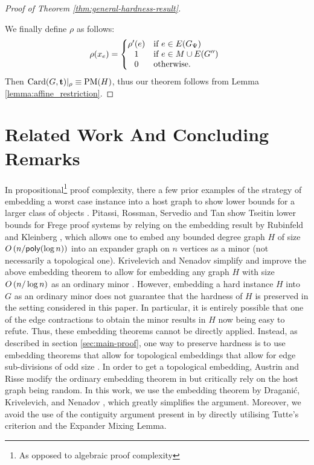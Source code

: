 \documentclass[11pt]{article}
\begin{document}
\begin{proof}[Proof of Theorem \ref{thm:general-hardness-result}]
\begin{enumerate}
\end{enumerate}

We finally define $\rho$ as follows:
\[
\rho(x_e) =
\left\{
\begin{array}{@{}cl}
\rho'(e) & \text{if } e \in \Edges{G_{\EmbeddingFunc}} \\
1 & \text{if } e \in M \cup E(G'') \\
0 & \text{otherwise.}
\end{array}
\right.
\]
Then $\text{Card}(G, \mathbf{t})|_\rho \equiv \text{PM}(H)$, thus our theorem follows from Lemma \ref{lemma:affine_restriction}.
\end{proof}


\section{Related Work And Concluding Remarks}
\label{sec:related-work}

In propositional\footnote{As opposed to algebraic proof complexity} proof complexity, there a few prior examples of the strategy of embedding a worst case instance into a host graph to show lower bounds for a larger class of objects \cite{itsykson2021Near, pitassi2016PolyLogFrege}.
Pitassi, Rossman, Servedio and Tan show Tseitin lower bounds for Frege proof systems \citep{pitassi2016PolyLogFrege} by relying on the embedding result by Rubinfeld and Kleinberg \citep{kleinberg1996short}, which allows one to embed any bounded degree graph $H$ of size $O\left(n/\mathsf{poly}(\log n)\right)$ into an expander graph on $n$ vertices as a minor (not necessarily a topological one). 
Krivelevich and Nenadov simplify and improve the above embedding theorem to allow for embedding any graph $H$ with size $O\left(n/\log n\right)$ as an ordinary minor \citep{krivelevich2021completeMinors}.
However, embedding a hard instance $H$ into $G$ as an ordinary minor does not guarantee that the hardness of $H$ is preserved in the setting considered in this paper. In particular, it is entirely possible that one of the edge contractions to obtain the minor results in $H$ now being easy to refute.
Thus, these embedding theorems cannot be directly applied.
Instead, as described in section \ref{sec:main-proof}, one way to preserve hardness is to use  embedding theorems that allow for topological embeddings that allow for edge sub-divisions of odd size \citep{draganic22rolling, nenadov2023routing}.
In order to get a topological embedding, Austrin and Risse modify the ordinary embedding theorem in \citep{krivelevich2021completeMinors} but critically rely on the host graph being random.
In this work, we use the embedding theorem by Dragani\'c, Krivelevich, and Nenadov \cite{draganic22rolling}, which greatly simplifies the argument. Moreover, we avoid the use of the contiguity argument present in \cite{Austrin_2022} by directly utilising Tutte's criterion and the Expander Mixing Lemma.
\end{document}

